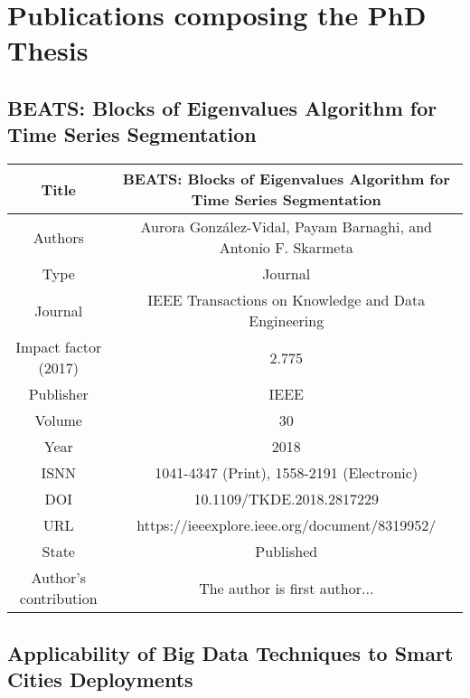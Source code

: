 %
%

\let\textcircled=\pgftextcircled
\chapter{Publications composing the PhD Thesis}
\label{chap:pub}


\section{BEATS: Blocks of Eigenvalues Algorithm for Time Series Segmentation}
\label{sec:BEATS}



\begin{table}[ht]
\centering
\begin{tabular}{c|c}
\hline
Title & BEATS: Blocks of Eigenvalues Algorithm for Time Series Segmentation \\
\hline
\rowcolor{LightCyan}
Authors & Aurora González-Vidal, Payam Barnaghi, and Antonio F. Skarmeta \\
Type & Journal \\
\rowcolor{LightCyan}
Journal & IEEE Transactions on Knowledge and Data Engineering \\
Impact factor (2017)& 2.775 \\
\rowcolor{LightCyan}
Publisher & IEEE \\
Volume & 30  \\
\rowcolor{LightCyan}
Year & 2018 \\
ISNN& 1041-4347 (Print), 1558-2191 (Electronic) \\
\rowcolor{LightCyan}
DOI&  10.1109/TKDE.2018.2817229  \\
URL & https://ieeexplore.ieee.org/document/8319952/ \\
\rowcolor{LightCyan}
State & Published \\
Author's contribution & The author is first author... \\
\hline
\end{tabular}
\end{table}
 

 


\section{Applicability of Big Data Techniques to Smart Cities Deployments}
\label{sec:Applica}

